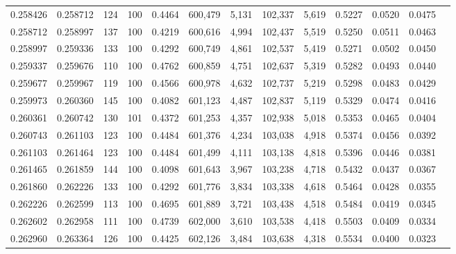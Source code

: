 \begin{tabular}{rrrrrrrrrrrrr}
0.258426 & 0.258712 &   124 & 100 &                                     0.4464 & 600,479 &   5,131 & 102,337 &   5,619 & 0.5227 & 0.0520 & 0.0475 \\
0.258712 & 0.258997 &   137 & 100 &                                     0.4219 & 600,616 &   4,994 & 102,437 &   5,519 & 0.5250 & 0.0511 & 0.0463 \\
0.258997 & 0.259336 &   133 & 100 &                                     0.4292 & 600,749 &   4,861 & 102,537 &   5,419 & 0.5271 & 0.0502 & 0.0450 \\
0.259337 & 0.259676 &   110 & 100 &                                     0.4762 & 600,859 &   4,751 & 102,637 &   5,319 & 0.5282 & 0.0493 & 0.0440 \\
0.259677 & 0.259967 &   119 & 100 &                                     0.4566 & 600,978 &   4,632 & 102,737 &   5,219 & 0.5298 & 0.0483 & 0.0429 \\
0.259973 & 0.260360 &   145 & 100 &                                     0.4082 & 601,123 &   4,487 & 102,837 &   5,119 & 0.5329 & 0.0474 & 0.0416 \\
0.260361 & 0.260742 &   130 & 101 &                                     0.4372 & 601,253 &   4,357 & 102,938 &   5,018 & 0.5353 & 0.0465 & 0.0404 \\
0.260743 & 0.261103 &   123 & 100 &                                     0.4484 & 601,376 &   4,234 & 103,038 &   4,918 & 0.5374 & 0.0456 & 0.0392 \\
0.261103 & 0.261464 &   123 & 100 &                                     0.4484 & 601,499 &   4,111 & 103,138 &   4,818 & 0.5396 & 0.0446 & 0.0381 \\
0.261465 & 0.261859 &   144 & 100 &                                     0.4098 & 601,643 &   3,967 & 103,238 &   4,718 & 0.5432 & 0.0437 & 0.0367 \\
0.261860 & 0.262226 &   133 & 100 &                                     0.4292 & 601,776 &   3,834 & 103,338 &   4,618 & 0.5464 & 0.0428 & 0.0355 \\
0.262226 & 0.262599 &   113 & 100 &                                     0.4695 & 601,889 &   3,721 & 103,438 &   4,518 & 0.5484 & 0.0419 & 0.0345 \\
0.262602 & 0.262958 &   111 & 100 &                                     0.4739 & 602,000 &   3,610 & 103,538 &   4,418 & 0.5503 & 0.0409 & 0.0334 \\
0.262960 & 0.263364 &   126 & 100 &                                     0.4425 & 602,126 &   3,484 & 103,638 &   4,318 & 0.5534 & 0.0400 & 0.0323 \\

\end{tabular}
